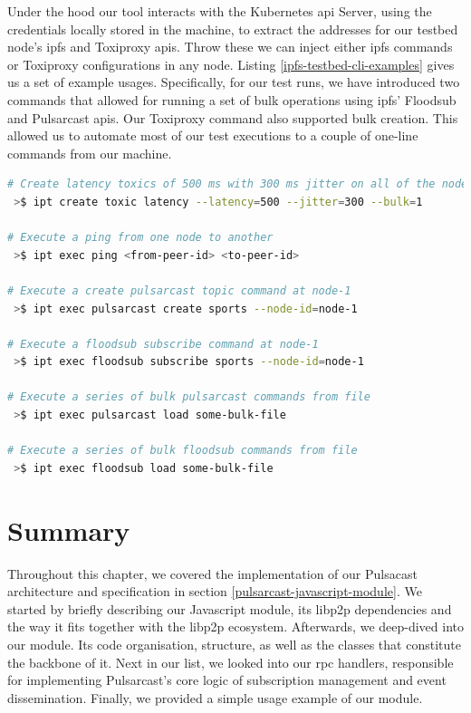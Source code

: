 Under the hood our tool interacts with the Kubernetes \acrshort{api} Server,
using the credentials locally stored in the machine, to extract the addresses
for our testbed node's \acrshort{ipfs} and Toxiproxy \acrshort{api}s. Throw
these we can inject either \acrshort{ipfs} commands or Toxiproxy configurations
in any node. Listing \ref{ipfs-testbed-cli-examples} gives us a set of example
usages. Specifically, for our test runs, we have introduced two commands that
allowed for running a set of bulk operations using \acrshort{ipfs}' Floodsub
and Pulsarcast \acrshort{api}s.  Our Toxiproxy command also supported bulk
creation. This allowed us to automate most of our test executions to a couple
of one-line commands from our machine.

\begin{lstlisting}[language=bash, float, caption={\acrshort{ipfs} Testbed \acrshort{cli} example
usages},label={ipfs-testbed-cli-examples}]
# Create latency toxics of 500 ms with 300 ms jitter on all of the nodes (bulk=1)
 >$ ipt create toxic latency --latency=500 --jitter=300 --bulk=1

# Execute a ping from one node to another
 >$ ipt exec ping <from-peer-id> <to-peer-id>

# Execute a create pulsarcast topic command at node-1
 >$ ipt exec pulsarcast create sports --node-id=node-1

# Execute a floodsub subscribe command at node-1
 >$ ipt exec floodsub subscribe sports --node-id=node-1

# Execute a series of bulk pulsarcast commands from file
 >$ ipt exec pulsarcast load some-bulk-file

# Execute a series of bulk floodsub commands from file
 >$ ipt exec floodsub load some-bulk-file

\end{lstlisting}

\section{Summary}\label{summary}

Throughout this chapter, we covered the implementation of our Pulsacast
architecture and specification in section \ref{pulsarcast-javascript-module}.
We started by briefly describing our Javascript module, its libp2p dependencies
and the way it fits together with the libp2p ecosystem. Afterwards, we
deep-dived into our module. Its code organisation, structure, as well as the
classes that constitute the backbone of it. Next in our list, we looked into
our \acrshort{rpc} handlers, responsible for implementing Pulsarcast's core
logic of subscription management and event dissemination.  Finally, we provided
a simple usage example of our module.


